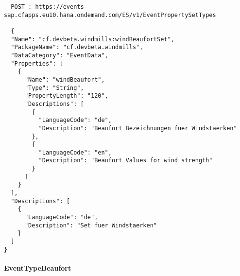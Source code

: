 \begin{lstlisting}
  POST : https://events-sap.cfapps.eu10.hana.ondemand.com/ES/v1/EventPropertySetTypes

  {
  "Name": "cf.devbeta.windmills:windBeaufortSet",
  "PackageName": "cf.devbeta.windmills",
  "DataCategory": "EventData",
  "Properties": [
    {
      "Name": "windBeaufort",
      "Type": "String",
      "PropertyLength": "120",
      "Descriptions": [
        {
          "LanguageCode": "de",
          "Description": "Beaufort Bezeichnungen fuer Windstaerken"
        },
        {
          "LanguageCode": "en",
          "Description": "Beaufort Values for wind strength"
        }
      ]
    }
  ],
  "Descriptions": [
    {
      "LanguageCode": "de",
      "Description": "Set fuer Windstaerken"
    }
  ]
}
\end{lstlisting}

\paragraph{EventTypeBeaufort}

